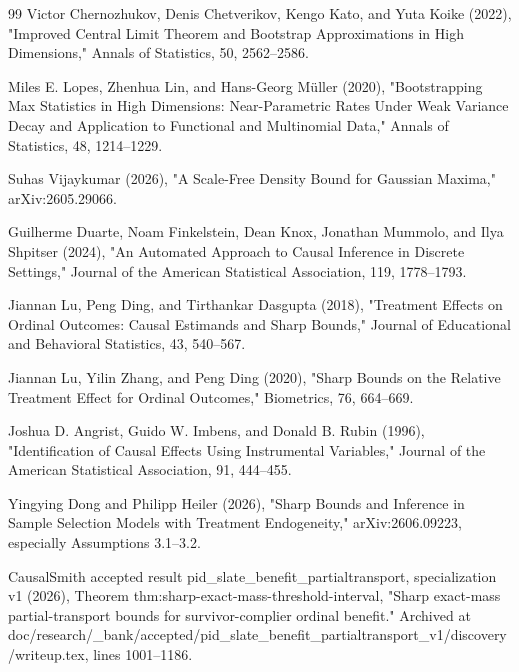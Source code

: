 \documentclass{article}
\begin{document}
\begin{thebibliography}{99}
   Victor Chernozhukov, Denis Chetverikov, Kengo Kato, and Yuta Koike (2022), "Improved Central Limit Theorem and Bootstrap Approximations in High Dimensions," Annals of Statistics, 50, 2562--2586.

   Miles E. Lopes, Zhenhua Lin, and Hans-Georg Müller (2020), "Bootstrapping Max Statistics in High Dimensions: Near-Parametric Rates Under Weak Variance Decay and Application to Functional and Multinomial Data," Annals of Statistics, 48, 1214--1229.

   Suhas Vijaykumar (2026), "A Scale-Free Density Bound for Gaussian Maxima," arXiv:2605.29066.

   Guilherme Duarte, Noam Finkelstein, Dean Knox, Jonathan Mummolo, and Ilya Shpitser (2024), "An Automated Approach to Causal Inference in Discrete Settings," Journal of the American Statistical Association, 119, 1778--1793.

   Jiannan Lu, Peng Ding, and Tirthankar Dasgupta (2018), "Treatment Effects on Ordinal Outcomes: Causal Estimands and Sharp Bounds," Journal of Educational and Behavioral Statistics, 43, 540--567.

   Jiannan Lu, Yilin Zhang, and Peng Ding (2020), "Sharp Bounds on the Relative Treatment Effect for Ordinal Outcomes," Biometrics, 76, 664--669.

   Joshua D. Angrist, Guido W. Imbens, and Donald B. Rubin (1996), "Identification of Causal Effects Using Instrumental Variables," Journal of the American Statistical Association, 91, 444--455.

   Yingying Dong and Philipp Heiler (2026), "Sharp Bounds and Inference in Sample Selection Models with Treatment Endogeneity," arXiv:2606.09223, especially Assumptions 3.1--3.2.

   CausalSmith accepted result pid\_slate\_benefit\_partialtransport, specialization v1 (2026), Theorem thm:sharp-exact-mass-threshold-interval, "Sharp exact-mass partial-transport bounds for survivor-complier ordinal benefit." Archived at doc/research/\_bank/accepted/pid\_slate\_benefit\_partialtransport\_v1/discovery/writeup.tex, lines 1001--1186.

\end{thebibliography}
\end{document}
